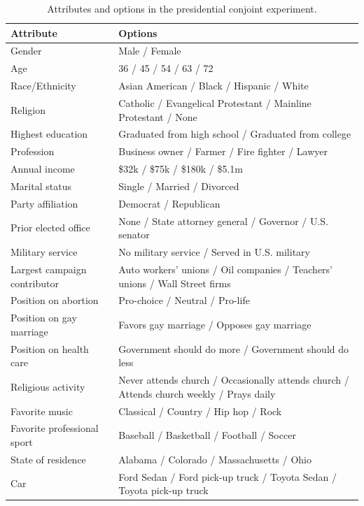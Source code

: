 \documentclass{article}
\begin{document}
\begin{table}[htbp]
\centering
\caption{Attributes and options in the presidential conjoint experiment.}
\label{tab:presidential-attributes}
\begin{tabular}{lp{9cm}}
\toprule
\textbf{Attribute} & \textbf{Options} \\
\midrule
Gender & Male / Female \\
Age & 36 / 45 / 54 / 63 / 72 \\
Race/Ethnicity & Asian American / Black / Hispanic / White \\
Religion & Catholic / Evangelical Protestant / Mainline Protestant / None \\
Highest education & Graduated from high school / Graduated from college \\
Profession & Business owner / Farmer / Fire fighter / Lawyer \\
Annual income & \$32k / \$75k / \$180k / \$5.1m \\
Marital status & Single / Married / Divorced \\
Party affiliation & Democrat / Republican \\
Prior elected office & None / State attorney general / Governor / U.S. senator \\
Military service & No military service / Served in U.S. military \\
Largest campaign contributor & Auto workers' unions / Oil companies / Teachers' unions / Wall Street firms \\
Position on abortion & Pro-choice / Neutral / Pro-life \\
Position on gay marriage & Favors gay marriage / Opposes gay marriage \\
Position on health care & Government should do more / Government should do less \\
Religious activity & Never attends church / Occasionally attends church / Attends church weekly / Prays daily \\
Favorite music & Classical / Country / Hip hop / Rock \\
Favorite professional sport & Baseball / Basketball / Football / Soccer \\
State of residence & Alabama / Colorado / Massachusetts / Ohio \\
Car & Ford Sedan / Ford pick-up truck / Toyota Sedan / Toyota pick-up truck \\
\bottomrule
\end{tabular}
\end{table}
\end{document}
